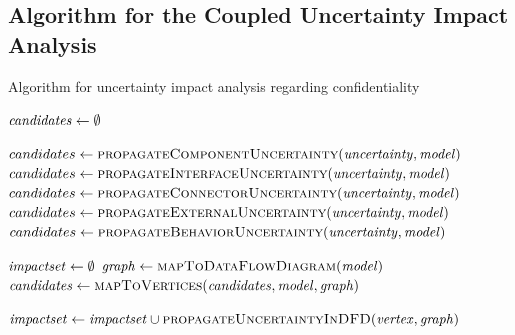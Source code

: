 \subsection{Algorithm for the Coupled Uncertainty Impact Analysis}

\begin{algorithm}
    \caption{Algorithm for uncertainty impact analysis regarding confidentiality}
    \label{alg:impactanalysis:impactanalysis}
    \begin{algorithmic}[1] 
            \algindentskip
            \State $\mathit{candidates} \gets \emptyset$ \label{alg:impactanalysis:impactanalysis:2}
            \algblockskip

              \label{alg:impactanalysis:impactanalysis:3}
                    \State $candidates \gets \textsc{propagateComponentUncertainty}(\mathit{uncertainty}, \mathit{model})$
                \EndCase
                    \State $candidates \gets \textsc{propagateInterfaceUncertainty}(\mathit{uncertainty}, \mathit{model})$
                \EndCase
                    \State $candidates \gets \textsc{propagateConnectorUncertainty}(\mathit{uncertainty}, \mathit{model})$
                \EndCase
                    \State $candidates \gets \textsc{propagateExternalUncertainty}(\mathit{uncertainty}, \mathit{model})$
                \EndCase
                    \State $candidates \gets \textsc{propagateBehaviorUncertainty}(\mathit{uncertainty}, \mathit{model})$
                \EndCase
            \EndSwitch
            \algblockskip

            \State $\mathit{impactset} \gets \emptyset$ 
            \State $\mathit{graph} \gets \textsc{mapToDataFlowDiagram}(\mathit{model})$ \label{alg:impactanalysis:impactanalysis:15}
            \State $\mathit{candidates} \gets \textsc{mapToVertices}(\mathit{candidates}, \mathit{model}, \mathit{graph})$ \label{alg:impactanalysis:impactanalysis:16}
            \algblockskip

              \label{alg:impactanalysis:impactanalysis:17}
                \State $\mathit{impactset} \gets \mathit{impactset} \cup \textsc{propagateUncertaintyInDFD}(\mathit{vertex}, \mathit{graph})$
            \EndFor
            \algblockskip

            \State {} \label{alg:impactanalysis:impactanalysis:20}
            \algindentskip
        \EndProcedure
    \end{algorithmic}
\end{algorithm}

